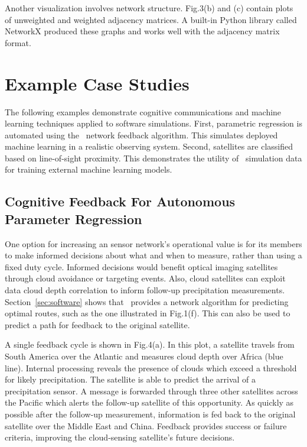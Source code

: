 \documentclass[conference]{IEEEtran}
\newcommand{\project}{{\sc{Collaborate}}~}
\begin{document}
Another visualization involves network structure.  Fig.3(b) and (c) contain
plots of unweighted and weighted adjacency matrices.  A built-in Python library
called NetworkX produced these graphs and works well with the adjacency matrix
format.


\section{Example Case Studies}
\label{sec:examples}

The following examples demonstrate cognitive communications and machine learning
techniques applied to software simulations.  First, parametric regression is
automated using the \project network feedback algorithm.  This simulates
deployed machine learning in a realistic observing system.  Second, satellites
are classified based on line-of-sight proximity.  This demonstrates the utility
of \project simulation data for training external machine learning models.

\subsection{Cognitive Feedback For Autonomous Parameter Regression}
\label{ssec:feedback}

One option for increasing an sensor network's operational value is for its
members to make informed decisions about what and when to measure, rather than
using a fixed duty cycle.  Informed decisions would benefit optical imaging
satellites through cloud avoidance or targeting events.  Also, cloud satellites
can exploit data cloud depth correlation to inform follow-up precipitation
measurements.  Section~\ref{sec:software} shows that \project provides a network
algorithm for predicting optimal routes, such as the one illustrated in
Fig.1(f).  This can also be used to predict a path for feedback to the original
satellite.

A single feedback cycle is shown in Fig.4(a).  In this plot, a satellite travels
from South America over the Atlantic and measures cloud depth over Africa (blue
line).  Internal processing reveals the presence of clouds which exceed a
threshold for likely precipitation.  The satellite is able to predict the
arrival of a precipitation sensor.  A message is forwarded through three other
satellites across the Pacific which alerts the follow-up satellite of this
opportunity.  As quickly as possible after the follow-up measurement,
information is fed back to the original satellite over the Middle East and
China.  Feedback provides success or failure criteria, improving the
cloud-sensing satellite's future decisions.
\end{document}

